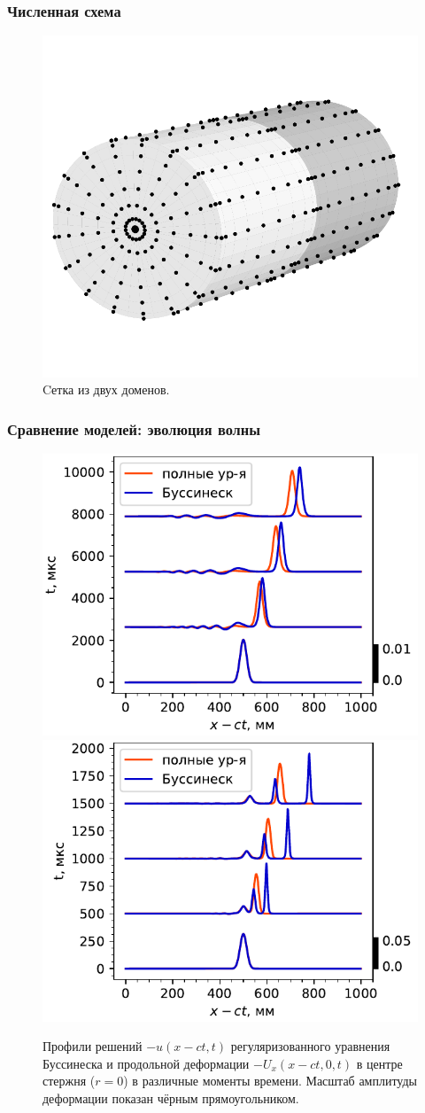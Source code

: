 \documentclass{beamer}
\begin{document}
\begin{frame} \frametitle{Численная схема}
\begin{figure}[h!]
	\centering
	\centering
	\includegraphics[width=.35\textwidth]{figures/Grid3D}
	\caption{Cетка из двух доменов.}
\end{figure}
\end{frame}


\begin{frame} \frametitle{Сравнение моделей: эволюция волны}
\begin{figure}[h]
	\centering
	\includegraphics[width=0.49\linewidth]{figures/SolEvolCompareSmallColor}
	\includegraphics[width=0.49\linewidth]{figures/SolEvolCompareSmallColor2}
	\caption{Профили решений $-u(x-ct, t)$ регуляризованного уравнения Буссинеска и продольной деформации $-U_x(x - ct, 0, t)$ в центре стержня ($r=0$) в различные моменты времени. Масштаб амплитуды деформации показан чёрным прямоугольником.}
\end{figure}
\end{frame}
\end{document}
